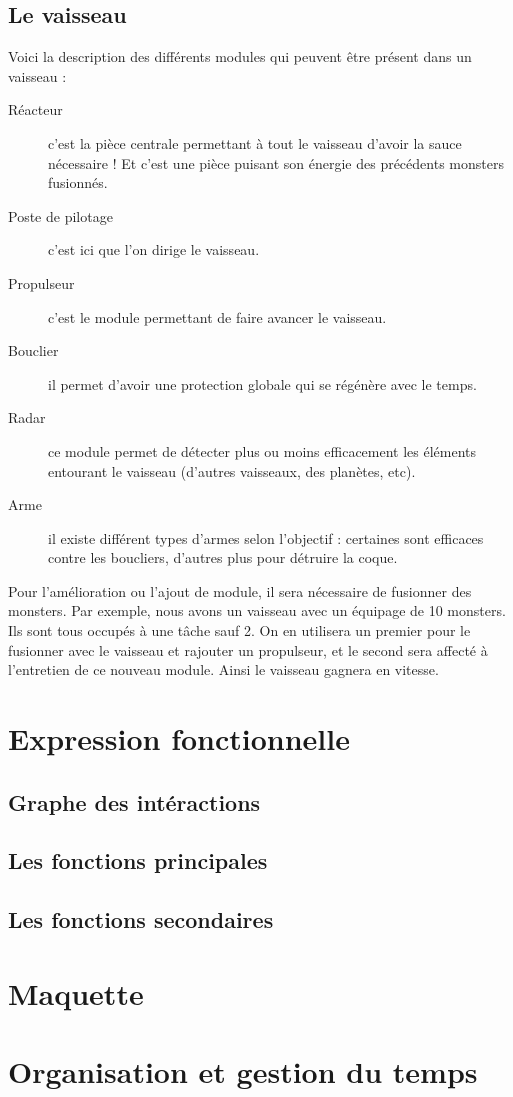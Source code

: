 \documentclass[a4paper,11pt]{report}
\begin{document}
    \section{Le vaisseau}
      Voici la description des différents modules qui peuvent être présent dans un vaisseau :
      \begin{description}
        \item[Réacteur] c'est la pièce centrale permettant à tout le vaisseau d'avoir la sauce nécessaire ! Et c'est une pièce puisant son énergie des précédents monsters fusionnés.
        \item[Poste de pilotage] c'est ici que l'on dirige le vaisseau.
        \item[Propulseur] c'est le module permettant de faire avancer le vaisseau.
        \item[Bouclier] il permet d'avoir une protection globale qui se régénère avec le temps.
        \item[Radar] ce module permet de détecter plus ou moins efficacement les éléments entourant le vaisseau (d'autres vaisseaux, des planètes, etc).
        \item[Arme] il existe différent types d'armes selon l'objectif : certaines sont efficaces contre les boucliers, d'autres plus pour détruire la coque.
      \end{description}
      Pour l'amélioration ou l'ajout de module, il sera nécessaire de fusionner des monsters. Par exemple, nous avons un vaisseau avec un équipage de 10 monsters. Ils sont tous occupés à une tâche sauf 2. On en utilisera un premier pour le fusionner avec le vaisseau et rajouter un propulseur, et le second sera affecté à l'entretien de ce nouveau module. Ainsi le vaisseau gagnera en vitesse.

\chapter{Expression fonctionnelle}
    \section{Graphe des intéractions}

    \section{Les fonctions principales}

    \section{Les fonctions secondaires}
    
    
\chapter{Maquette}


\chapter{Organisation et gestion du temps}
\end{document}
